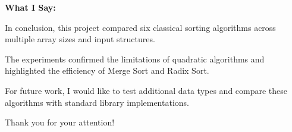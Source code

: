 \documentclass[12pt]{article}
\begin{document}
\textbf{What I Say:}

In conclusion, this project compared six classical sorting algorithms across multiple array sizes and input structures.

The experiments confirmed the limitations of quadratic algorithms and highlighted the efficiency of Merge Sort and Radix Sort.

For future work, I would like to test additional data types and compare these algorithms with standard library implementations.

\vspace{0.5cm}

Thank you for your attention!
\end{document}
